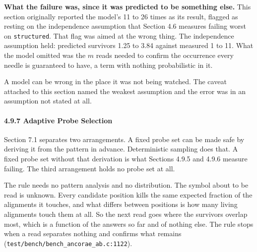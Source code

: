 \textbf{What the failure was, since it was predicted to be something else.} This section originally reported the model's 11 to 26 times as its result, flagged as resting on the independence assumption that Section 4.6 measures failing worst on \texttt{structured}. That flag was aimed at the wrong thing. The independence assumption held: predicted survivors 1.25 to 3.84 against measured 1 to 11. What the model omitted was the \(m\) reads needed to confirm the occurrence every needle is guaranteed to have, a term with nothing probabilistic in it.

A model can be wrong in the place it was not being watched. The caveat attached to this section named the weakest assumption and the error was in an assumption not stated at all.

\paragraph{4.9.7 Adaptive Probe Selection}

Section 7.1 separates two arrangements. A fixed probe set can be made safe by deriving it from the pattern in advance. Deterministic sampling does that. A fixed probe set without that derivation is what Sections 4.9.5 and 4.9.6 measure failing. The third arrangement holds no probe set at all.

The rule needs no pattern analysis and no distribution. The symbol about to be read is unknown. Every candidate position kills the same expected fraction of the alignments it touches, and what differs between positions is how many living alignments touch them at all. So the next read goes where the survivors overlap most, which is a function of the answers so far and of nothing else. The rule stops when a read separates nothing and confirms what remains (\texttt{test/\allowbreak{}bench/\allowbreak{}bench\_\allowbreak{}ancorae\_\allowbreak{}ab.\allowbreak{}c:1122}).

